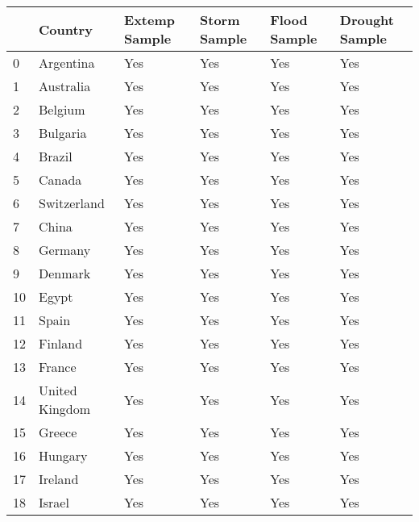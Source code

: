 \begin{tabular}{llllll}
\toprule
{} &         Country & Extemp Sample & Storm Sample & Flood Sample & Drought Sample \\
\midrule
0  &       Argentina &           Yes &          Yes &          Yes &            Yes \\
1  &       Australia &           Yes &          Yes &          Yes &            Yes \\
2  &         Belgium &           Yes &          Yes &          Yes &            Yes \\
3  &        Bulgaria &           Yes &          Yes &          Yes &            Yes \\
4  &          Brazil &           Yes &          Yes &          Yes &            Yes \\
5  &          Canada &           Yes &          Yes &          Yes &            Yes \\
6  &     Switzerland &           Yes &          Yes &          Yes &            Yes \\
7  &           China &           Yes &          Yes &          Yes &            Yes \\
8  &         Germany &           Yes &          Yes &          Yes &            Yes \\
9  &         Denmark &           Yes &          Yes &          Yes &            Yes \\
10 &           Egypt &           Yes &          Yes &          Yes &            Yes \\
11 &           Spain &           Yes &          Yes &          Yes &            Yes \\
12 &         Finland &           Yes &          Yes &          Yes &            Yes \\
13 &          France &           Yes &          Yes &          Yes &            Yes \\
14 &  United Kingdom &           Yes &          Yes &          Yes &            Yes \\
15 &          Greece &           Yes &          Yes &          Yes &            Yes \\
16 &         Hungary &           Yes &          Yes &          Yes &            Yes \\
17 &         Ireland &           Yes &          Yes &          Yes &            Yes \\
18 &          Israel &           Yes &          Yes &          Yes &            Yes \\

\end{tabular}
